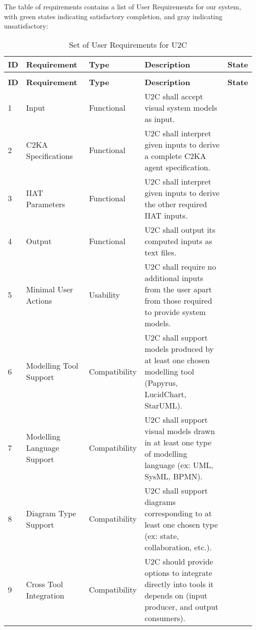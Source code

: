 The table of requirements contains a list of User Requirements for our system,
with green states indicating satisfactory completion, and gray indicating unsatisfactory:
\begin{longtable}{|l|p{2.6cm}|l|p{4.5cm}|c|}
    \caption{Set of User Requirements for U2C}\label{tab:user-reqs}\\ \hline
    \textbf{ID} & \textbf{Requirement} & \textbf{Type}  & \textbf{Description} & \textbf{State} \\ \hline
    \endfirsthead
    \caption{Set of User Requirements for U2C} \\ \hline
    \textbf{ID} & \textbf{Requirement} & \textbf{Type}  & \textbf{Description} & \textbf{State} \\
    \hline
    \endhead
    \hline
    1 & Input & Functional & U2C shall accept visual system models as input. & \cellcolor{green!30}  \\
    \hline
    2 & C2KA Specifications & Functional & U2C shall interpret given inputs to derive a complete C2KA agent specification. & \cellcolor{green!30}  \\
    \hline
    3 & IIAT Parameters & Functional & U2C shall interpret given inputs to derive the other required IIAT inputs. & \cellcolor{gray!30}  \\
    \hline
    4 & Output & Functional & U2C shall output its computed inputs as text files. & \cellcolor{green!30}  \\
    \hline
    5 & Minimal User Actions & Usability & U2C shall require no additional inputs from the user apart from those required to provide system models. & \cellcolor{green!30}  \\
    \hline
    6 & Modelling Tool Support & Compatibility & U2C shall support models produced by at least one chosen modelling tool (Papyrus, LucidChart, StarUML). & \cellcolor{green!30}  \\
    \hline
    7 & Modelling Language Support & Compatibility & U2C shall support visual models drawn in at least one type of modelling language (ex: UML, SysML, BPMN). & \cellcolor{green!30}  \\
    \hline
    8 & Diagram Type Support & Compatibility & U2C shall support diagrams corresponding to at least one chosen type (ex: state, collaboration, etc.). & \cellcolor{green!30}  \\
    \hline
    9 & Cross Tool Integration & Compatibility & U2C should provide options to integrate directly into tools it depends on (input producer, and output consumers). & \cellcolor{gray!30}  \\

\end{longtable}
